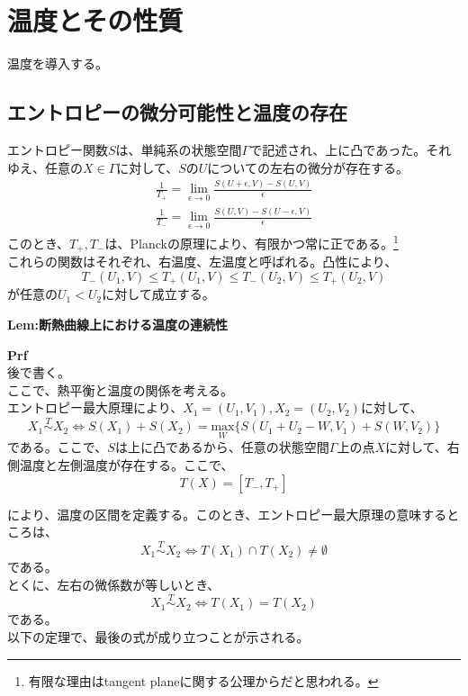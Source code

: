 \documentclass[a4paper,11pt]{jsarticle}
\begin{document}
\section{温度とその性質}
温度を導入する。\\
\subsection{エントロピーの微分可能性と温度の存在}
エントロピー関数$S$は、単純系の状態空間$\Gamma$で記述され、上に凸であった。それゆえ、任意の$X \in \Gamma$に対して、$S$の$U$についての左右の微分が存在する。\\
\begin{align}
    \frac{1}{T_+} =\lim_{\epsilon \to 0} \frac{S(U+\epsilon,V)-S(U,V)}{\epsilon}\\
    \frac{1}{T_-} =\lim_{\epsilon \to 0} \frac{S(U,V)-S(U-\epsilon,V)}{\epsilon}
\end{align}
このとき、$T_+,T_-$は、Planckの原理により、有限かつ常に正である。\footnote{有限な理由はtangent planeに関する公理からだと思われる。}\\
これらの関数はそれぞれ、右温度、左温度と呼ばれる。凸性により、
\begin{equation}
    T_-(U_1,V) \leq T_+(U_1,V) \leq T_-(U_2,V) \leq T_+(U_2,V)
\end{equation}
が任意の$U_1<U_2$に対して成立する。\\

\begin{itembox}[l]{\textbf{Lem:断熱曲線上における温度の連続性}}


\end{itembox}
\textbf{Prf}\\
後で書く。\hfill\qedsymbol\\

ここで、熱平衡と温度の関係を考える。\\
エントロピー最大原理により、$X_1=(U_1,V_1),X_2=(U_2,V_2)$に対して、
\begin{equation}
    X_1 \overset{T}{\sim} X_2 \Leftrightarrow S(X_1) +S(X_2) =\underset{W}{\text{max}}\{S(U_1+U_2-W,V_1)+S(W,V_2)\}
\end{equation}
である。ここで、$S$は上に凸であるから、任意の状態空間$\Gamma$上の点$X$に対して、右側温度と左側温度が存在する。ここで、
\begin{equation}
    T(X) = [T_-,T_+]
\end{equation}

により、温度の区間を定義する。このとき、エントロピー最大原理の意味するところは、
\begin{equation}
    X_1 \overset{T}{\sim} X_2 \Leftrightarrow T(X_1)\cap T(X_2) \neq \emptyset
\end{equation}
である。\\
とくに、左右の微係数が等しいとき、
\begin{equation}
    X_1 \overset{T}{\sim} X_2 \Leftrightarrow T(X_1)=T(X_2)
\end{equation}
である。\\
以下の定理で、最後の式が成り立つことが示される。\\
\end{document}
